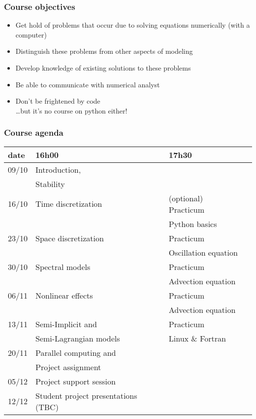 \documentclass[aspectratio=43,9pt]{beamer}
\begin{document}
%
%
\begin{frame}
	\frametitle{Course objectives}
	\begin{itemize}
		\item Get hold of problems that occur due to solving equations numerically (with a computer)\\[3ex]
\pause
		\item Distinguish these problems from other aspects of modeling
		\item Develop knowledge of existing solutions to these problems
		\item Be able to communicate with numerical analyst\\[3ex]
\pause
		\item Don't be frightened by code\\ \quad\ldots but it's no course on python either!
	\end{itemize}
\end{frame}
%
%
\begin{frame}
	\frametitle{Course agenda}
	\vspace*{-5mm}
	\begin{center}
		\def\arraystretch{1.3}
		\begin{tabular}{l|lll}
			date	&	16h00	&	17h30 \\
		\hline
			09/10 	& Introduction, \\[-4pt]
					& Stability	\\
			16/10	& Time discretization		&	(optional) Practicum	\\[-4pt]
					&							&	Python basics			\\
			23/10	& Space discretization		&	Practicum				\\[-4pt]
					& 							&	Oscillation equation	\\
			30/10	& Spectral models			& 	Practicum				\\[-4pt]
					&							&	Advection equation 		\\
			06/11	& Nonlinear effects		    &	Practicum				\\[-4pt]
					& 							&	Advection equation		\\
			13/11	& Semi-Implicit and		 	&	Practicum				\\[-4pt]
					& Semi-Lagrangian models	&	Linux \& Fortran		\\
			20/11	& Parallel computing and	&							\\[-4pt]
					& Project assignment		&							\\
		\hline
			05/12	& Project support session	\\
			12/12	& Student project presentations (TBC)
		\end{tabular}
		\def\arraystretch{1}
	\end{center}
\end{frame}
\end{document}
